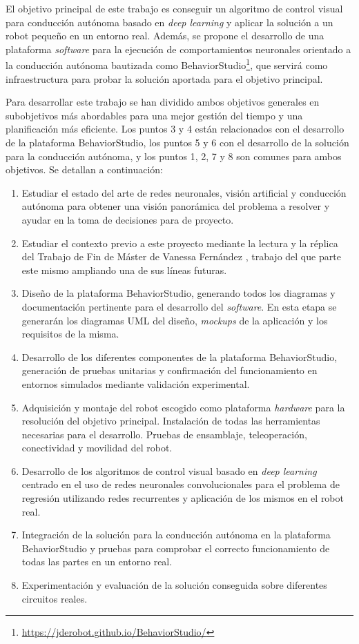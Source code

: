 El objetivo principal de este trabajo es conseguir un algoritmo de control visual para conducción autónoma basado en \textit{deep learning} y aplicar la solución a un robot pequeño en un entorno real. Además, se propone el desarrollo de una plataforma \textit{software} para la ejecución de comportamientos neuronales orientado a la conducción autónoma bautizada como BehaviorStudio\footnote{\url{https://jderobot.github.io/BehaviorStudio/}}, que servirá como infraestructura para probar la solución aportada para el objetivo principal.

Para desarrollar este trabajo se han dividido ambos objetivos generales en subobjetivos más abordables para una mejor gestión del tiempo y una planificación más eficiente. Los puntos 3 y 4 están relacionados con el desarrollo de la plataforma BehaviorStudio, los puntos 5 y 6 con el desarrollo de la solución para la conducción autónoma, y los puntos 1, 2, 7 y 8 son comunes para ambos objetivos. Se detallan a continuación:

\begin{enumerate}
    \item Estudiar el estado del arte de redes neuronales, visión artificial y conducción autónoma para obtener una visión panorámica del problema a resolver y ayudar en la toma de decisiones para de proyecto.
    \item Estudiar el contexto previo a este proyecto mediante la lectura y la réplica del Trabajo de Fin de Máster de Vanessa Fernández \cite{vanessa}, trabajo del que parte este mismo ampliando una de sus líneas futuras.
    \item Diseño de la plataforma BehaviorStudio, generando todos los diagramas y documentación pertinente para el desarrollo del \textit{software}. En esta etapa se generarán los diagramas UML del diseño, \textit{mockups} de la aplicación y los requisitos de la misma.
    \item Desarrollo de los diferentes componentes de la plataforma BehaviorStudio, generación de pruebas unitarias y confirmación del funcionamiento en entornos simulados mediante validación experimental.
    \item Adquisición y montaje del robot escogido como plataforma \textit{hardware} para la resolución del objetivo principal. Instalación de todas las herramientas necesarias para el desarrollo. Pruebas de ensamblaje, teleoperación, conectividad y movilidad del robot. 
    \item Desarrollo de los algoritmos de control visual basado en \textit{deep learning} centrado en el uso de redes neuronales convolucionales para el problema de regresión utilizando redes recurrentes y aplicación de los mismos en el robot real.
    \item Integración de la solución para la conducción autónoma en la plataforma BehaviorStudio y pruebas para comprobar el correcto funcionamiento de todas las partes en un entorno real.
    \item Experimentación y evaluación de la solución conseguida sobre diferentes circuitos reales.
    
\end{enumerate}

